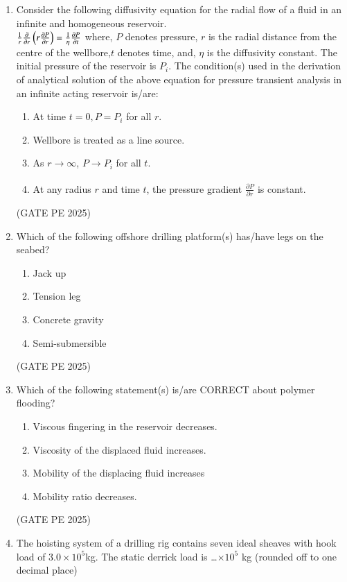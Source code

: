 \documentclass[journal,12pt,onecolumn]{IEEEtran}
\theoremstyle{remark}
\begin{document}
\begin{enumerate}
\item Consider the following diffusivity equation for the radial flow of a fluid in an infinite and homogeneous reservoir.\\
$\frac{1}{r}\frac{\partial}{\partial r}\left(r\frac{\partial P}{\partial r}\right)=\frac{1}{\eta}\frac{\partial P}{\partial t}$
where, $P$ denotes pressure, $r$ is the radial distance from the centre of the wellbore,$t$ denotes time, and, $\eta$ is the diffusivity constant. The initial pressure of the reservoir
is $P_i$.
The condition(s) used in the derivation of analytical solution of the above equation for pressure transient analysis in an infinite acting reservoir is/are:
\begin{enumerate}
    \item At time $t=0, P=P_i$ for all $r$.
    \item Wellbore is treated as a line source.
    \item As $r\xrightarrow[]{} \infty$, $P\xrightarrow[]{} P_i$ for all $t$.
    \item At any radius $r$ and time $t$, the pressure gradient $\frac{\partial P}{\partial r}$ is constant.
\end{enumerate}
\hfill{(GATE PE 2025)}

\item Which of the following offshore drilling platform(s) has/have legs on the seabed?
\begin{enumerate}
    \item Jack up
    \item Tension leg
    \item Concrete gravity
    \item Semi-submersible
\end{enumerate}
\hfill{(GATE PE 2025)}

\item Which of the following statement(s) is/are CORRECT about polymer flooding?
\begin{enumerate}
    \item Viscous fingering in the reservoir decreases.
    \item Viscosity of the displaced fluid increases.
    \item Mobility of the displacing fluid increases
    \item Mobility ratio decreases.
\end{enumerate}
\hfill{(GATE PE 2025)}

\item The hoisting system of a drilling rig contains seven ideal sheaves with hook load of $3.0 \times 10^5$kg.
The static derrick load is \dots $\times 10^5$ kg (rounded off to one decimal place)


\end{enumerate}
\end{document}

